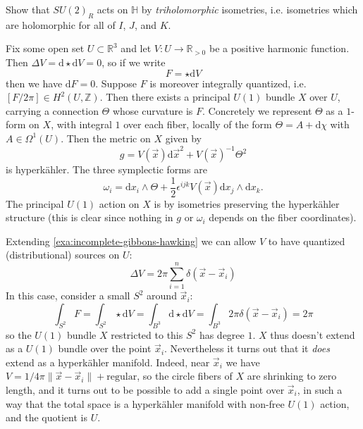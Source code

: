 \documentclass[12pt,letterpaper,reqno]{amsart}
\numberwithin{equation}{section}
\newcommand{\R}{\ensuremath{\mathbb R}}
\newcommand{\Z}{\ensuremath{\mathbb Z}}
\newcommand{\bbH}{\ensuremath{\mathbb H}}
\newcommand{\half}{\ensuremath{\frac{1}{2}}}
\newcommand{\hk}{hyperk\"ahler\xspace}
\newcommand{\de}{\mathrm{d}}
\newcommand{\norm}[1]{\lVert#1\rVert}
\newcommand{\eps}{\epsilon}
\newcommand{\ti}[1]{\textit{#1}}
\newcommand{\fixme}[1]{{\color{blue}{[#1]}}}
\begin{document}
\begin{exercise} \label{exc:so4-action}
Show that $SU(2)_R$ acts on $\bbH$ by \ti{triholomorphic} 
isometries, i.e. isometries which are holomorphic for
all of $I$, $J$, and $K$.
\end{exercise}

\begin{example} \label{exa:incomplete-gibbons-hawking}
Fix some open set $U \subset \R^3$ and
let $V: U \to \R_{>0}$ be a positive harmonic function.
Then $\Delta V = \de \star \de V = 0$, so if we write
\begin{equation}
  F = \star \de V
\end{equation}
then we have $\de F = 0$. Suppose $F$ is moreover integrally
quantized, i.e. $[F/2\pi] \in H^2(U,\Z)$. Then
there exists a principal 
$U(1)$ bundle $X$ over $U$, carrying a connection
$\Theta$ whose curvature is $F$. Concretely we represent
$\Theta$ as a $1$-form on $X$, with 
integral $1$ over each fiber, locally of the form
$\Theta = A + \de \chi$ with $A \in \Omega^1(U)$.
Then the metric on $X$ given by
\begin{equation}
  g = V(\vec{x}) \de \vec{x}^2 + V(\vec{x})^{-1} \Theta^2
\end{equation}
is \hk. The three symplectic forms are \fixme{check}
\begin{equation}
  \omega_i = \de x_i \wedge \Theta + \half \eps^{ijk} V(\vec x) \de x_j \wedge \de x_k.
\end{equation}
The principal $U(1)$ action on $X$ is by isometries preserving
the \hk structure (this is clear since nothing in $g$ or $\omega_i$
depends on the fiber coordinates).
\end{example}

\begin{example} \label{exa:gibbons-hawking}
Extending \autoref{exa:incomplete-gibbons-hawking}
we can allow $V$ to have quantized (distributional) sources
on $U$:
\begin{equation}
  \Delta V = 2 \pi \sum_{i=1}^n \delta(\vec x - \vec x_i)
\end{equation}
In this case, consider a small $S^2$ around $\vec{x}_i$:
\begin{equation}
  \int_{S^2} F = \int_{S^2} \star \de V = \int_{B^3} \de \star \de V = \int_{B^3} 2 \pi \delta(\vec x - \vec x_i) = 2 \pi
\end{equation}
so the $U(1)$ bundle $X$ restricted to this $S^2$ has 
degree $1$. $X$ thus doesn't extend as a $U(1)$ bundle
over the point $\vec x_i$.
Nevertheless it turns out that it \ti{does} extend
as a \hk manifold. Indeed, near $\vec x_i$ we have
\fixme{fix wrong factor of $2 \pi$ somewhere!}
$V = 1 / 4 \pi \norm{\vec x - \vec x_i} + \text{regular}$,
so the circle fibers of $X$ are shrinking to zero
length, and it turns out to be possible to add
a single point over $\vec x_i$, in such a way 
that the total space is a \hk manifold with non-free 
$U(1)$ action, and the quotient is $U$.

\end{example}
\end{document}
